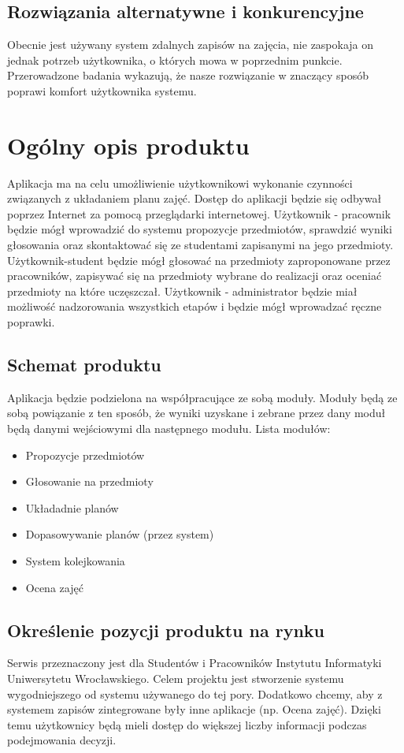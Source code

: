 \documentclass[11pt,leqno]{article}
\begin{document}
\subsection{Rozwiązania alternatywne i konkurencyjne}
Obecnie jest używany system zdalnych zapisów na zajęcia, nie zaspokaja on jednak potrzeb użytkownika, o których mowa w poprzednim punkcie. Przerowadzone badania wykazują, że nasze rozwiązanie w znaczący sposób poprawi komfort użytkownika systemu.

\section{Ogólny opis produktu}
Aplikacja ma na celu umożliwienie użytkownikowi wykonanie czynności związanych z układaniem planu zajęć. Dostęp do aplikacji będzie się odbywał poprzez Internet za pomocą przeglądarki internetowej. Użytkownik - pracownik będzie mógł wprowadzić do systemu propozycje przedmiotów, sprawdzić wyniki głosowania oraz skontaktować się ze studentami zapisanymi na jego przedmioty. Użytkownik-student będzie mógł głosować na przedmioty zaproponowane przez pracowników, zapisywać się na przedmioty wybrane do realizacji oraz oceniać przedmioty na które uczęszczał. Użytkownik - administrator będzie miał możliwość nadzorowania wszystkich etapów i będzie mógł wprowadzać ręczne poprawki.

\subsection{Schemat produktu}
Aplikacja będzie podzielona na współpracujące ze sobą moduły. Moduły będą ze sobą powiązanie z ten sposób, że wyniki uzyskane i zebrane przez dany moduł będą danymi wejściowymi dla następnego modułu.
Lista modułów:
\begin{itemize}
\item Propozycje przedmiotów
\item Głosowanie na przedmioty
\item Układadnie planów
\item Dopasowywanie planów (przez system)
\item System kolejkowania
\item Ocena zajęć
\end{itemize}

\subsection{Określenie pozycji produktu na rynku}
Serwis przeznaczony jest dla Studentów i Pracowników Instytutu Informatyki Uniwersytetu Wrocławskiego. Celem projektu jest stworzenie systemu wygodniejszego od systemu używanego do tej pory. Dodatkowo chcemy, aby z systemem zapisów zintegrowane były inne aplikacje (np. Ocena zajęć). Dzięki temu użytkownicy będą mieli dostęp do większej liczby informacji podczas podejmowania decyzji.
\end{document}
